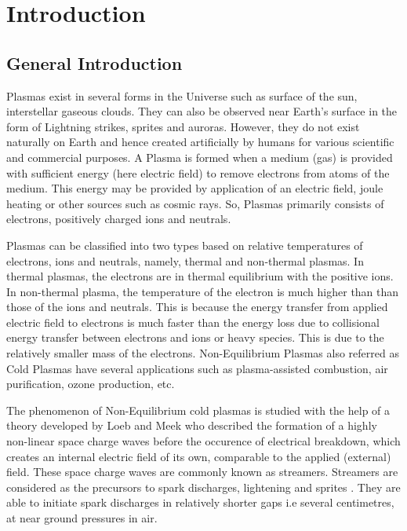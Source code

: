 \chapter{Introduction}
\section{General Introduction}
Plasmas exist in several forms in the Universe such as surface of the sun, interstellar gaseous clouds. They can also be observed near Earth's surface in the form of Lightning strikes, sprites and auroras. However, they do not exist naturally on Earth and hence created artificially by humans for various scientific and commercial purposes. A Plasma is formed when a medium (gas) is provided with sufficient energy (here electric field) to remove electrons from atoms of the medium. This energy may be provided by application of an electric field, joule heating or other sources such as cosmic rays. So, Plasmas primarily consists of electrons, positively charged ions and neutrals.

Plasmas can be classified into two types based on relative temperatures of electrons, ions and neutrals, namely, thermal and non-thermal plasmas. In thermal plasmas, the electrons are in thermal equilibrium with the positive ions. In non-thermal plasma, the temperature of the electron is much higher than than those of the ions and neutrals. This is because the energy transfer from applied electric field to electrons is much faster than the energy loss due to collisional energy transfer between electrons and ions or heavy species. This is due to the relatively smaller mass of the electrons. Non-Equilibrium Plasmas also referred as Cold Plasmas have several applications such as plasma-assisted combustion, air purification, ozone production, etc.

The phenomenon of Non-Equilibrium cold plasmas is studied with the help of a theory developed by Loeb and Meek \cite{Loeb and Meek , 1940a and 1940b} who described the formation of a highly non-linear space charge waves before the occurence of electrical breakdown, which creates an internal electric field of its own, comparable to the applied (external) field. These space charge waves are commonly known as streamers. Streamers are considered as the precursors to spark discharges, lightening\cite{Bazelyan et Raizer 2000} and sprites \cite{Franz et al 1990; Bourdon et al 2007}. They are able to initiate spark discharges in relatively shorter gaps i.e several centimetres, at near ground pressures in air.  

